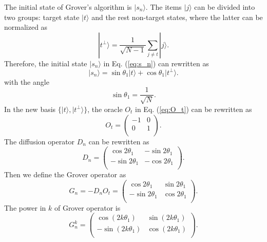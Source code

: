 \documentclass[a4paper,10pt]{article}
\numberwithin{equation}{section}
\begin{document}
The initial state of Grover's algorithm is $|s_n\rangle$. The items $|j\rangle$ can be divided into two groups: target state $|t\rangle$ and the rest non-target states, where the latter can be normalized as
\begin{equation}
    |t^\perp\rangle = \frac{1}{\sqrt {N-1}}\sum_{j\neq t}|j\rangle.
\end{equation}
Therefore, the initial state $|s_n\rangle$ in Eq. (\ref{eq:s_n}) can rewritten as
\begin{equation}
\label{eq:sn_basis}
    |s_n\rangle = \sin\theta_1|t\rangle +  \cos\theta_1|t^\perp\rangle.
\end{equation}
with the angle 
\begin{equation}
    \sin\theta_1 = \frac{1}{\sqrt N}.
\end{equation} 
In the new basis $\{|t\rangle,|t^\perp\rangle\}$, the oracle $O_t$ in Eq. (\ref{eq:O_t}) can be rewritten as 
\begin{equation}
    O_t = \begin{pmatrix}
        -1 & 0 \\
        0 & 1 \\
    \end{pmatrix}.
\end{equation}
The diffusion operator $D_n$ can be rewritten as
\begin{equation}
    D_n = \begin{pmatrix}
        \cos 2\theta_1 & -\sin 2\theta_1  \\
        -\sin 2\theta_1 & -\cos 2\theta_1 \\
    \end{pmatrix}.
\end{equation}
Then we define the Grover operator as
\begin{equation}
\label{eq:G_n}
    G_n = -D_nO_t = \begin{pmatrix}
        \cos 2\theta_1 & \sin 2\theta_1  \\
        -\sin 2\theta_1 & \cos 2\theta_1 \\
    \end{pmatrix}.
\end{equation}
The power in $k$ of Grover operator is
\begin{equation}
    G_n^k = \begin{pmatrix}
        \cos(2k\theta_1) & \sin(2k\theta_1)  \\
        -\sin(2k\theta_1) & \cos(2k\theta_1) \\
    \end{pmatrix}.
\end{equation}
\end{document}
